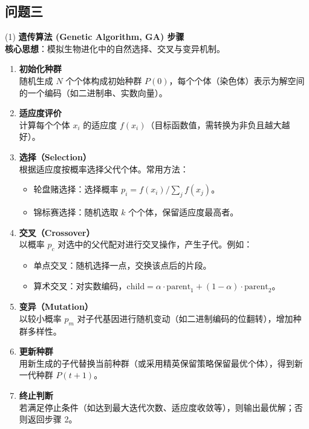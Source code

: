 \documentclass[UTF8]{article}
\begin{document}
\subsection*{问题三}
\vspace{0.5em}

(1) \textbf{遗传算法 (Genetic Algorithm, GA) 步骤} \\
\textbf{核心思想}：模拟生物进化中的自然选择、交叉与变异机制。\\

\begin{enumerate}[label=\textbf{步骤 \arabic*：}, leftmargin=2em, align=left]
    \item \textbf{初始化种群} \\
    随机生成 $N$ 个个体构成初始种群 $P(0)$，每个个体（染色体）表示为解空间的一个编码（如二进制串、实数向量）。
    
    \item \textbf{适应度评价} \\
    计算每个个体 $x_i$ 的适应度 $f(x_i)$（目标函数值，需转换为非负且越大越好）。
    
    \item \textbf{选择（Selection）} \\
    根据适应度按概率选择父代个体。常用方法：
    \begin{itemize}
        \item 轮盘赌选择：选择概率 $p_i = f(x_i) / \sum_j f(x_j)$。
        \item 锦标赛选择：随机选取 $k$ 个个体，保留适应度最高者。
    \end{itemize}
    
    \item \textbf{交叉（Crossover）} \\
    以概率 $p_c$ 对选中的父代配对进行交叉操作，产生子代。例如：
    \begin{itemize}
        \item 单点交叉：随机选择一点，交换该点后的片段。
        \item 算术交叉：对实数编码，$ \text{child} = \alpha \cdot \text{parent}_1 + (1-\alpha) \cdot \text{parent}_2$。
    \end{itemize}
    
    \item \textbf{变异（Mutation）} \\
    以较小概率 $p_m$ 对子代基因进行随机变动（如二进制编码的位翻转），增加种群多样性。
    
    \item \textbf{更新种群} \\
    用新生成的子代替换当前种群（或采用精英保留策略保留最优个体），得到新一代种群 $P(t+1)$。
    
    \item \textbf{终止判断} \\
    若满足停止条件（如达到最大迭代次数、适应度收敛等），则输出最优解；否则返回步骤 2。
\end{enumerate}
\end{document}
